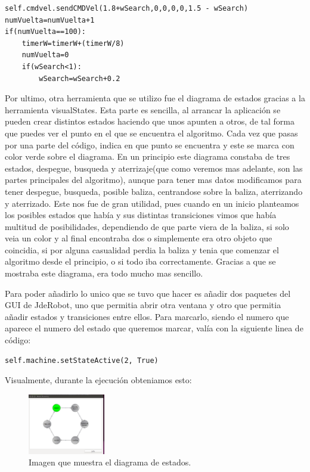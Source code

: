 \begin{verbatim}
self.cmdvel.sendCMDVel(1.8+wSearch,0,0,0,0,1.5 - wSearch)
numVuelta=numVuelta+1
if(numVuelta==100):
    timerW=timerW+(timerW/8)
    numVuelta=0
    if(wSearch<1):
        wSearch=wSearch+0.2
\end{verbatim}

\hspace{1cm} Por ultimo, otra herramienta que se utilizo fue el diagrama de estados gracias a la herramienta visualStates. Esta parte es sencilla, al arrancar la aplicaci\'on se pueden crear distintos estados haciendo que unos apunten a otros, de tal forma que puedes ver el punto en el que se encuentra el algoritmo. Cada vez que pasas por una parte del c\'odigo, indica en que punto se encuentra y este se marca con color verde sobre el diagrama. En un principio este diagrama constaba de tres estados, despegue, busqueda y aterrizaje(que como veremos mas adelante, son las partes principales del algoritmo), aunque para tener mas datos modificamos para tener despegue, busqueda, posible baliza, centrandose sobre la baliza, aterrizando y aterrizado.	Este nos fue de gran utilidad, pues cuando en un inicio planteamos los posibles estados que hab\'ia y sus distintas transiciones vimos que hab\'ia multitud de posibilidades, dependiendo de que parte viera de la baliza, si solo veia un color y al final encontraba dos o simplemente era otro objeto que coincidia, si por alguna casualidad perdia la baliza y tenia que comenzar el algoritmo desde el principio, o si todo iba correctamente. Gracias a que se mostraba este diagrama, era todo mucho mas sencillo.

\hspace{1cm} Para poder añadirlo lo unico que se tuvo que hacer es añadir dos paquetes del GUI de JdeRobot, uno que permitia abrir otra ventana y otro que permitia añadir estados y transiciones entre ellos. Para marcarlo, siendo el numero que aparece el numero del estado que queremos marcar, val\'ia con la siguiente linea de c\'odigo:

\begin{verbatim}
self.machine.setStateActive(2, True)
\end{verbatim}

Visualmente, durante la ejecuci\'on obteniamos esto:
\begin{figure}[ht]
	\centering
		\includegraphics[width=0.3\textwidth]{imgs/states.eps}
		\caption{Imagen que muestra el diagrama de estados.}
	\label{fig:k_Beacon1}
\end{figure}

